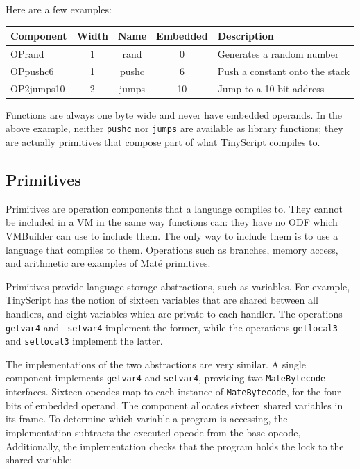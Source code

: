 \documentclass[12pt]{article}
\newcommand{\mate}{Mat\'{e}\xspace}
\begin{document}
Here are a few examples:

\vspace{0.1in}
{\scriptsize
\begin{tabular}{|l|c|c|c|l|} \hline
Component & Width & Name  & Embedded & Description\\ \hline
OPrand    &  1    & rand  & 0        & Generates a random number\\
OPpushc6  &  1    & pushc & 6        & Push a constant onto the stack\\
OP2jumps10&  2    & jumps & 10       & Jump to a 10-bit address\\ \hline
\end{tabular}
}
\vspace{0.1in}

Functions are always one byte wide and never have embedded
operands. In the above example, neither {\tt pushc} nor {\tt jumps}
are available as library functions; they are actually primitives that
compose part of what TinyScript compiles to.

\subsection{Primitives}

Primitives are operation components that a language compiles to. They
cannot be included in a VM in the same way functions can: they have no
ODF which VMBuilder can use to include them. The only way to include
them is to use a language that compiles to them. Operations such as
branches, memory access, and arithmetic are examples of \mate
primitives.

Primitives provide language storage abstractions, such as
variables. For example, TinyScript has the notion of sixteen variables
that are shared between all handlers, and eight variables which are
private to each handler. The operations {\tt getvar4} and {\tt
setvar4} implement the former, while the operations {\tt getlocal3}
and {\tt setlocal3} implement the latter.

The implementations of the two abstractions are very similar. A single
component implements {\tt getvar4} and {\tt setvar4}, providing two
{\tt MateBytecode} interfaces. Sixteen opcodes map to each instance of
{\tt MateBytecode}, for the four bits of embedded operand. The
component allocates sixteen shared variables in its frame.  To
determine which variable a program is accessing, the implementation
subtracts the executed opcode from the base opcode, Additionally, the
implementation checks that the program holds the lock to the shared
variable:
\end{document}
